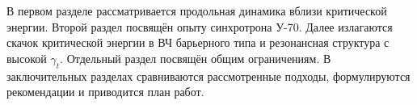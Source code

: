 В первом разделе рассматривается продольная динамика вблизи критической энергии. Второй раздел посвящён опыту синхротрона У-70. Далее излагаются скачок критической энергии в ВЧ барьерного типа и резонансная структура с высокой $\gamma_t$. Отдельный раздел посвящён общим ограничениям. В заключительных разделах сравниваются рассмотренные подходы, формулируются рекомендации и приводится план работ.
